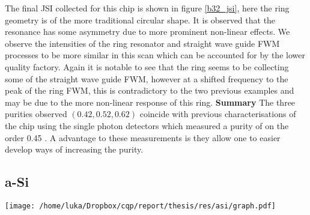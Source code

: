 The final JSI collected for this chip is shown in figure \ref{b32_jsi}, here the ring geometry is of the more traditional circular shape. It is observed that the resonance has some asymmetry due to more prominent non-linear effects. We observe the intensities of the ring resonator and straight wave guide FWM processes to be more similar in this scan which can be accounted for by the lower quality factory. Again it is notable to see that the ring seems to be collecting some of the straight wave guide FWM, however at a shifted frequency to the peak of the ring FWM, this is contradictory to the two previous examples and may be due to the more non-linear response of this ring.
\newline\newline
\noindent
{\bf Summary }The three purities observed $(0.42,0.52,0.62)$ coincide with previous characterisations of the chip using the single photon detectors which measured a purity of on the order 0.45 \cite{scammell_indistinguishable_2014}. A advantage to these measurements is they allow one to easier develop ways of increasing the purity.
\subsection{a-Si}


\begingroup
    \centering  
    \texttt{[image: /home/luka/Dropbox/cqp/report/thesis/res/asi/graph.pdf]}
     \vspace{3pt} \label{asi_jsi_grid}
\endgroup